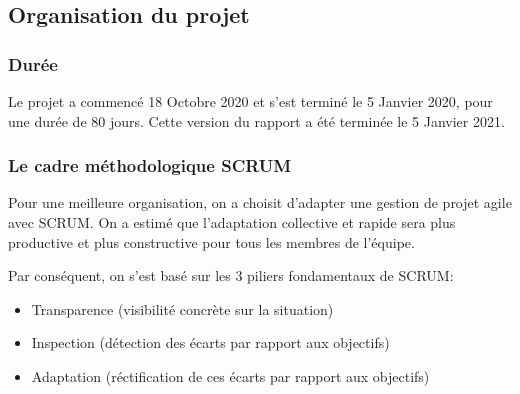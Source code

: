 \documentclass[12pt]{article}
\begin{document}
\subsection{Organisation du projet}
\subsubsection{Durée}
Le projet a commencé 18 Octobre 2020 et s'est terminé le 5 Janvier 2020, pour une durée de 80 jours. Cette version du rapport a été terminée le 5 Janvier 2021.

\subsubsection{Le cadre méthodologique SCRUM}

Pour une meilleure organisation, on a choisit d'adapter une gestion de projet agile avec SCRUM. On a estimé que l'adaptation collective et rapide sera plus productive et plus constructive pour tous les membres de l'équipe.

Par conséquent, on s'est basé sur les 3 piliers fondamentaux de SCRUM: 
\begin{itemize}
    \item Transparence (visibilité concrète sur la situation)
    \item Inspection (détection des écarts par rapport aux objectifs)
    \item Adaptation (réctification de ces écarts par rapport aux objectifs)
\end{itemize}
\end{document}
